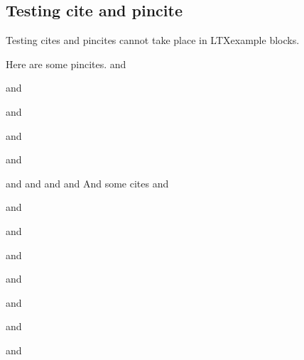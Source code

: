 \documentclass[12pt,\documentclassflag]{lawbrief}
\begin{document}
\subsection{Testing cite and pincite}
Testing cites and pincites cannot take place in LTXexample blocks.

  Here are some pincites.
  and \par
   and \par
   and \par 
   and \par
   and \par
   and 
   and 
   and  
   and  
  And some cites  and \par
  \cite{A} and \par
  \cite{A} and \par
  \cite{A} and \par
  \cite{A} and \par
  \cite{A} and \par
  \cite{A} and \par
  \cite{A} and \par
 
\end{document}
